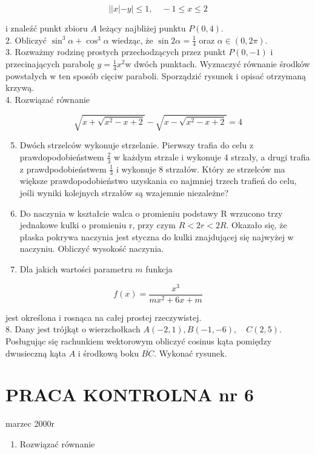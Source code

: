 \documentclass[10pt]{article}
\begin{document}
$$
||x|-y| \leqslant 1, \quad-1 \leqslant x \leqslant 2
$$

i znaleźć punkt zbioru $A$ leżący najbliżej punktu $P(0,4)$.\\
2. Obliczyć $\sin ^{3} \alpha+\cos ^{3} \alpha$ wiedząc, że $\sin 2 \alpha=\frac{1}{4}$ oraz $\alpha \in(0,2 \pi)$.\\
3. Rozważmy rodzinę prostych przechodzących przez punkt $P(0,-1)$ i przecinających parabolę $y=\frac{1}{4} x^{2} \mathrm{w}$ dwóch punktach. Wyznaczyć równanie środków powstałych w ten sposób cięciw paraboli. Sporządzić rysunek i opisać otrzymaną krzywą.\\
4. Rozwiązać równanie

$$
\sqrt{x+\sqrt{x^{2}-x+2}}-\sqrt{x-\sqrt{x^{2}-x+2}}=4
$$

\begin{enumerate}
  \setcounter{enumi}{4}
  \item Dwóch strzelców wykonuje strzelanie. Pierwszy trafia do celu z prawdopodobieństwem $\frac{2}{3}$ w każdym strzale i wykonuje 4 strzały, a drugi trafia z prawdpodobieństwem $\frac{1}{3}$ i wykonuje 8 strzałów. Który ze strzelców ma większe prawdopodobieństwo uzyskania co najmniej trzech trafień do celu, jeśli wyniki kolejnych strzałów są wzajemnie niezależne?
  \item Do naczynia w kształcie walca o promieniu podstawy R wrzucono trzy jednakowe kulki o promieniu r, przy czym $R<2 r<2 R$. Okazało się, że płaska pokrywa naczynia jest styczna do kulki znajdującej się najwyżej w naczyniu. Obliczyć wysokość naczynia.
  \item Dla jakich wartości parametru $m$ funkcja
\end{enumerate}

$$
f(x)=\frac{x^{3}}{m x^{2}+6 x+m}
$$

jest określona i rosnąca na całej prostej rzeczywistej.\\
8. Dany jest trójkąt o wierzchołkach $A(-2,1), B(-1,-6), \quad C(2,5)$. Posługując się rachunkiem wektorowym obliczyć cosinus kąta pomiędzy dwusieczną kąta $A$ i środkową boku $\overline{B C}$. Wykonać rysunek.

\section*{PRACA KONTROLNA nr 6}
marzec 2000r

\begin{enumerate}
  \item Rozwiązać równanie
\end{enumerate}
\end{document}
